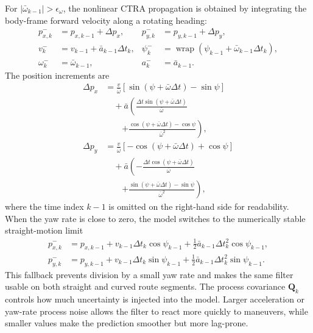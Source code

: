\documentclass[conference]{IEEEtran}
\begin{document}
For $|\bar{\omega}_{k-1}|>\epsilon_\omega$, the nonlinear CTRA propagation is obtained by integrating the body-frame forward velocity along a rotating heading:
\begin{align}
p_{x,k}^{-} &= p_{x,k-1} + \Delta p_x,
& p_{y,k}^{-} &= p_{y,k-1} + \Delta p_y,
\label{eq:pos_predict_compact}\\
v_k^{-} &= v_{k-1} + \bar{a}_{k-1}\Delta t_k,
& \psi_k^{-} &= \operatorname{wrap}(\psi_{k-1}+\bar{\omega}_{k-1}\Delta t_k),
\label{eq:vel_yaw_predict}\\
\omega_k^{-} &= \bar{\omega}_{k-1},
& a_k^{-} &= \bar{a}_{k-1}.
\label{eq:omega_accel_predict}
\end{align}
The position increments are
\begin{align}
\Delta p_x &= \frac{v}{\bar{\omega}}\left[\sin(\psi+\bar{\omega}\Delta t)-\sin\psi\right]
\nonumber\\
&\quad + \bar{a}\left(\frac{\Delta t\sin(\psi+\bar{\omega}\Delta t)}{\bar{\omega}}\right.
\nonumber\\
&\qquad\left.+\frac{\cos(\psi+\bar{\omega}\Delta t)-\cos\psi}{\bar{\omega}^{2}}\right),
\label{eq:delta_px}\\
\Delta p_y &= \frac{v}{\bar{\omega}}\left[-\cos(\psi+\bar{\omega}\Delta t)+\cos\psi\right]
\nonumber\\
&\quad + \bar{a}\left(-\frac{\Delta t\cos(\psi+\bar{\omega}\Delta t)}{\bar{\omega}}\right.
\nonumber\\
&\qquad\left.+\frac{\sin(\psi+\bar{\omega}\Delta t)-\sin\psi}{\bar{\omega}^{2}}\right),
\label{eq:delta_py}
\end{align}
where the time index $k-1$ is omitted on the right-hand side for readability. When the yaw rate is close to zero, the model switches to the numerically stable straight-motion limit
\begin{align}
p_{x,k}^{-} &= p_{x,k-1} + v_{k-1}\Delta t_k\cos\psi_{k-1}
+ \frac{1}{2}\bar{a}_{k-1}\Delta t_k^2\cos\psi_{k-1},
\label{eq:straight_px}\\
p_{y,k}^{-} &= p_{y,k-1} + v_{k-1}\Delta t_k\sin\psi_{k-1}
+ \frac{1}{2}\bar{a}_{k-1}\Delta t_k^2\sin\psi_{k-1}.
\label{eq:straight_py}
\end{align}
This fallback prevents division by a small yaw rate and makes the same filter usable on both straight and curved route segments. The process covariance $\mathbf{Q}_k$ controls how much uncertainty is injected into the model. Larger acceleration or yaw-rate process noise allows the filter to react more quickly to maneuvers, while smaller values make the prediction smoother but more lag-prone.
\end{document}
